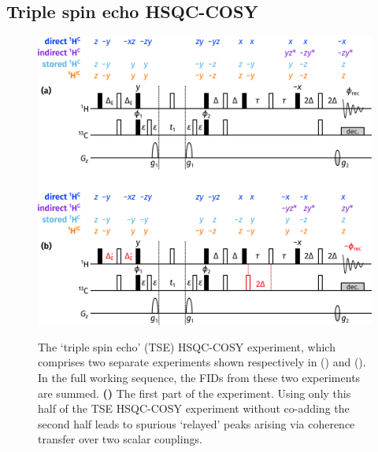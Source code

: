 \documentclass[a4paper,12pt]{article}
\newcommand{\magnnot}[1]{\ch{^1H}$^{!\ch{#1}}$}
\begin{document}
\begin{refsection}

\section{Triple spin echo HSQC-COSY}

\begin{figure}[!ht]
    \centering
    \includegraphics[]{tse_po.png}%
    {\label{fig:hsqcc_tse_po_1}}%
    {\label{fig:hsqcc_tse_po_2}}%
    \caption[Triple spin echo HSQC-COSY experiment]{
        The `triple spin echo' (TSE) HSQC-COSY experiment, which comprises two separate experiments shown respectively in () and ().
        In the full working sequence, the FIDs from these two experiments are summed.
        \textbf{()} The first part of the experiment.
        Using only this half of the TSE HSQC-COSY experiment without co-adding the second half leads to spurious `relayed' peaks arising via coherence transfer over two scalar couplings.
}
\end{figure}
\end{refsection}
\end{document}
